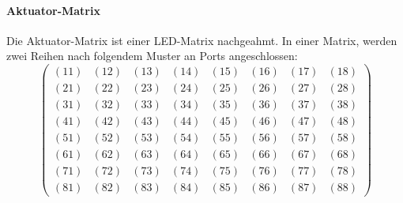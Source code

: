\begin{enumerate}
\paragraph{Aktuator-Matrix}
Die Aktuator-Matrix ist einer LED-Matrix nachgeahmt.
In einer Matrix, werden zwei Reihen nach folgendem Muster an Ports angeschlossen:
$$
\begin{pmatrix}
	(11) & (12) & (13) & (14) & (15) & (16) & (17) & (18) \\
	(21) & (22) & (23) & (24) & (25) & (26) & (27) & (28) \\
	(31) & (32) & (33) & (34) & (35) & (36) & (37) & (38) \\
	(41) & (42) & (43) & (44) & (45) & (46) & (47) & (48) \\
	(51) & (52) & (53) & (54) & (55) & (56) & (57) & (58) \\
	(61) & (62) & (63) & (64) & (65) & (66) & (67) & (68) \\
	(71) & (72) & (73) & (74) & (75) & (76) & (77) & (78) \\
	(81) & (82) & (83) & (84) & (85) & (86) & (87) & (88)
\end{pmatrix}
$$


\end{enumerate}
